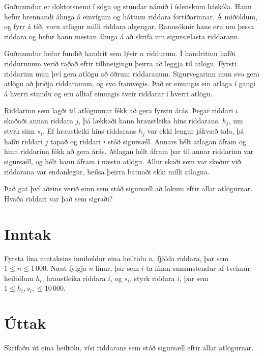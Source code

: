 
Guðmundur er doktorsnemi í sögu og stundar námið í íslenskum háskóla.
Hann hefur brennandi áhuga á einvígum og háttum riddara fortíðarinnar.
Á miðöldum, og fyrr á tíð, voru atlögur milli riddara algengar.
Rannsóknir hans eru um þessa riddara og hefur hann mestan áhuga á að skrifa um sigursælasta riddarann.

Guðmundur hefur fundið handrit sem lýsir $n$ riddurum.
Í handritinu hafði riddurunum verið raðað eftir tilhneigingu þeirra að leggja til atlögu.
Fyrsti riddarinn mun því gera atlögu að öðrum riddaranum.
Sigurvegarinn mun svo gera atlögu að þriðja riddaranum, og svo framvegis.
Það er einungis ein atlaga í gangi á hverri stundu og eru alltaf einungis tveir riddarar í hverri atlögu.

Riddarinn sem lagði til atlögunnar fékk að gera fyrstu árás.
Þegar riddari $i$ skaðaði annan riddara $j$, þá lækkaði hann hraustleika hins riddarans, $h_j$, um styrk sinn $s_i$.
Ef hraustleiki hins riddarans $h_j$ var ekki lengur jákvæð tala, þá hafði riddari $j$ tapað og riddari $i$ stóð sigursæll.
Annars hélt atlagan áfram og hinn riddarinn fékk að gera árás.
Atlagan hélt áfram þar til annar riddarinn var sigursæll, og hélt hann áfram í næstu atlögu.
Allur skaði sem var skeður við riddarana var endanlegur, heilsa þeirra batnaði ekki milli atlagna.

Það gat því aðeins verið einn sem stóð sigursæll að lokum eftir allar atlögurnar.
Hvaða riddari var það sem sigraði?

\section*{Inntak}
Fyrsta lína inntaksins inniheldur eina heiltölu $n$, fjölda riddara, þar sem $1 \leq n \leq 1\,000$.
Næst fylgja $n$ línur, þar sem $i$-ta línan samanstendur af tveimur heiltölum $h_i$, hraustleika riddara $i$, og $s_i$, styrk riddara $i$, þar sem $1 \leq h_i, s_i, \leq 10\,000$.

\section*{Úttak}
Skrifaðu út eina heiltölu, vísi riddarans sem stóð sigursæll eftir allar atlögurnar.
